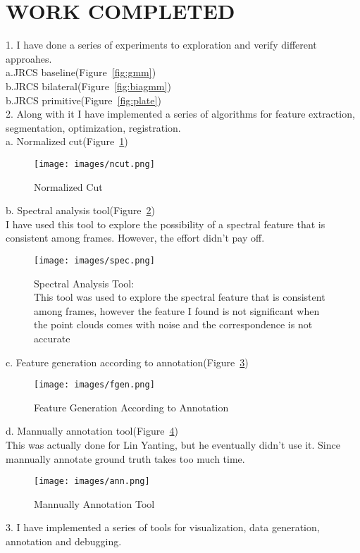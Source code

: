\documentclass{onrannual}
\begin{document}
\section{WORK COMPLETED}
1. I have done a series of experiments to exploration and verify different approahes.\\
a.JRCS baseline(Figure~\ref{fig:gmm})\\
b.JRCS bilateral(Figure~\ref{fig:biagmm})\\
b.JRCS primitive(Figure~\ref{fig:plate})\\
2. Along with it I have implemented a series of algorithms for feature extraction, segmentation, optimization, registration.\\
a. Normalized cut(Figure~\ref{fig:ncut})\\
\begin{figure}
	\begin{center}
		\texttt{[image: images/ncut.png]}
	\end{center}
	\caption{Normalized Cut}
	\label{fig:ncut}
\end{figure}
b. Spectral analysis tool(Figure~\ref{fig:spec})\\
I have used this tool to explore the possibility of a spectral feature that is consistent among frames. However, the effort didn't pay off.
\begin{figure}
	\begin{center}
		\texttt{[image: images/spec.png]}
	\end{center}
	\caption{Spectral Analysis Tool:\\This tool was used to explore the spectral feature that is consistent among frames, however the feature I found is not significant when the point clouds comes with noise and the correspondence is not accurate}
	\label{fig:spec}
\end{figure}
c. Feature generation according to annotation(Figure~\ref{fig:fgen})\\
\begin{figure}
	\begin{center}
		\texttt{[image: images/fgen.png]}
	\end{center}
	\caption{Feature Generation According to Annotation}
	\label{fig:fgen}
\end{figure}
d. Mannually annotation tool(Figure~\ref{fig:ann})\\
This was actually done for Lin Yanting, but he eventually didn't use it. Since mannually annotate ground truth takes too much time.
\begin{figure}
	\begin{center}
		\texttt{[image: images/ann.png]}
	\end{center}
	\caption{Mannually Annotation Tool}
	\label{fig:ann}
\end{figure}
3. I have implemented a series of tools for visualization, data generation, annotation and debugging.\\
\end{document}
